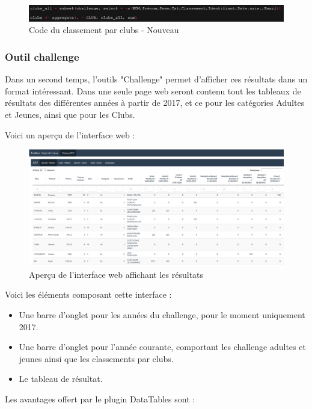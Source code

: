 \begin{figure}[!h]
	\center
	\includegraphics[scale=0.9]{img/codenew.PNG}
	\caption {Code du classement par clubs - Nouveau}
\end{figure}




\subsubsection{Outil challenge}

Dans un second temps, l'outils "Challenge" permet d'afficher ces résultats dans un format intéressant.
Dans une seule page web seront contenu tout les tableaux de résultats des différentes années à partir de 2017, et ce pour les catégories Adultes et Jeunes, ainsi que pour les Clubs.

Voici un aperçu de l'interface web :

\begin{figure}[!h]
	\center
	\includegraphics[scale=0.45]{img/online.PNG}
	\caption {Aperçu de l'interface web affichant les résultats}
\end{figure}

Voici les éléments composant cette interface :

\begin{itemize} 
	\item Une barre d'onglet pour les années du challenge, pour le moment uniquement 2017.
	\item Une barre d'onglet pour l'année courante, comportant les challenge adultes et jeunes ainsi que les classements par clubs.
	\item Le tableau de résultat.
\end{itemize}

Les avantages offert par le plugin DataTables sont :


